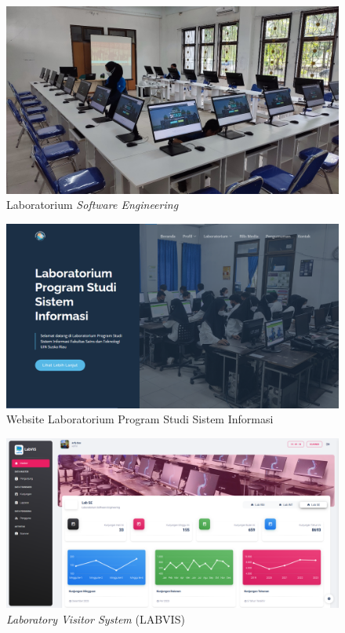 \begin{figure}
	\centering
	\includegraphics[width=0.82\linewidth]{konten/gambar/lab-se.jpg}
	\caption{Laboratorium \textit{Software Engineering}}
	\label{fig:lab-se-bab2}
\end{figure}

\begin{figure}
	\centering
	\includegraphics[width=0.82\linewidth]{konten//gambar/labsi.png}
	\caption{Website Laboratorium Program Studi Sistem Informasi}
	\label{fig:labsi-website-bab2}
\end{figure}

\begin{figure}
	\centering
	\includegraphics[width=0.82\linewidth]{konten//gambar/labvis.png}
	\caption{\textit{Laboratory Visitor System} (LABVIS)}
	\label{fig:labvis-bab2}
\end{figure}

